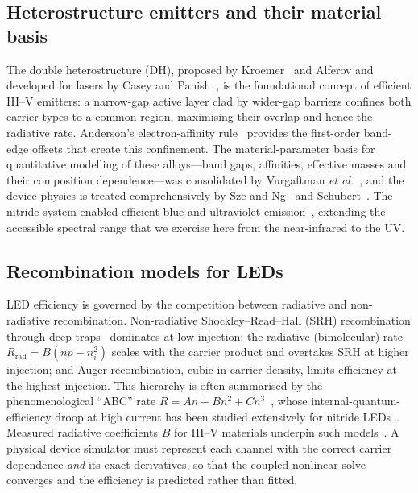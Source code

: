 \documentclass[conference]{IEEEtran}
\begin{document}
\subsection{Heterostructure emitters and their material basis}
The double heterostructure (DH), proposed by Kroemer~\cite{kroemer} and Alferov and
developed for lasers by Casey and Panish~\cite{caseypanish,alferov}, is the
foundational concept of efficient III--V emitters: a narrow-gap active layer clad
by wider-gap barriers confines both carrier types to a common region, maximising
their overlap and hence the radiative rate. Anderson's electron-affinity
rule~\cite{anderson} provides the first-order band-edge offsets that create this
confinement. The material-parameter basis for quantitative modelling of these
alloys---band gaps, affinities, effective masses and their composition
dependence---was consolidated by Vurgaftman \emph{et al.}~\cite{vurgaftman}, and
the device physics is treated comprehensively by Sze and Ng~\cite{sze} and
Schubert~\cite{schubert}. The nitride system enabled efficient blue and
ultraviolet emission~\cite{nakamura}, extending the accessible spectral range that
we exercise here from the near-infrared to the UV.

\subsection{Recombination models for LEDs}
LED efficiency is governed by the competition between radiative and non-radiative
recombination. Non-radiative Shockley--Read--Hall (SRH) recombination through deep
traps~\cite{shockley,hall} dominates at low injection; the radiative
(bimolecular) rate $R_{\mathrm{rad}}=B(np-n_i^2)$ scales with the carrier product
and overtakes SRH at higher injection; and Auger recombination, cubic in carrier
density, limits efficiency at the highest injection. This hierarchy is often
summarised by the phenomenological ``ABC'' rate
$R=An+Bn^2+Cn^3$~\cite{karpov}, whose internal-quantum-efficiency droop at high
current has been studied extensively for nitride
LEDs~\cite{piprek_droop,karpov}. Measured radiative coefficients $B$ for III--V
materials underpin such models~\cite{olshansky}. A physical device simulator must
represent each channel with the correct carrier dependence \emph{and} its exact
derivatives, so that the coupled nonlinear solve converges and the efficiency is
predicted rather than fitted.
\end{document}
